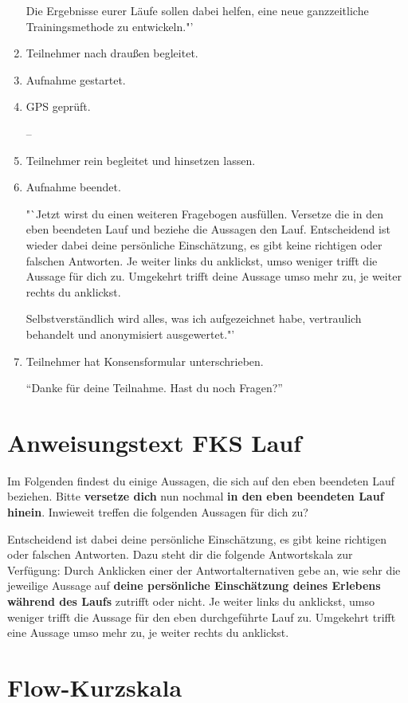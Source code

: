 \begin{enumerate}
Die Ergebnisse eurer Läufe sollen dabei helfen, eine neue ganzzeitliche Trainingsmethode zu entwickeln."'

\item Teilnehmer nach draußen begleitet. 
\item Aufnahme gestartet.
\item GPS geprüft.

--

\item Teilnehmer rein begleitet und hinsetzen lassen.
\item Aufnahme beendet.

"`Jetzt wirst du einen weiteren Fragebogen ausfüllen. Versetze die in den eben beendeten Lauf und beziehe die Aussagen den Lauf. Entscheidend ist wieder dabei deine persönliche Einschätzung, es gibt keine richtigen oder falschen Antworten. Je weiter links du anklickst, umso weniger trifft die Aussage für dich zu. Umgekehrt trifft deine Aussage umso mehr zu, je weiter rechts du anklickst.

Selbstverständlich wird alles, was ich aufgezeichnet habe, vertraulich behandelt und anonymisiert ausgewertet."'

\item Teilnehmer hat Konsensformular unterschrieben. 

"`Danke für deine Teilnahme. Hast du noch Fragen?"'
\end{enumerate}
\pagebreak

\section{Anweisungstext FKS Lauf}
Im Folgenden findest du einige Aussagen, die sich auf den eben beendeten Lauf beziehen. Bitte \textbf{versetze dich} nun nochmal \textbf{in den eben beendeten Lauf hinein}. Inwieweit treffen die folgenden Aussagen für dich zu?

Entscheidend ist dabei deine persönliche Einschätzung, es gibt keine richtigen oder falschen Antworten. Dazu steht dir die folgende Antwortskala zur Verfügung: 
Durch Anklicken einer der Antwortalternativen gebe an, wie sehr die jeweilige Aussage auf \textbf{deine persönliche Einschätzung deines Erlebens während des Laufs} zutrifft oder nicht. Je weiter links du anklickst, umso weniger trifft die Aussage für den eben durchgeführte Lauf zu. Umgekehrt trifft eine Aussage umso mehr zu, je weiter rechts du anklickst.
\pagebreak
\section{Flow-Kurzskala}
\pagebreak
